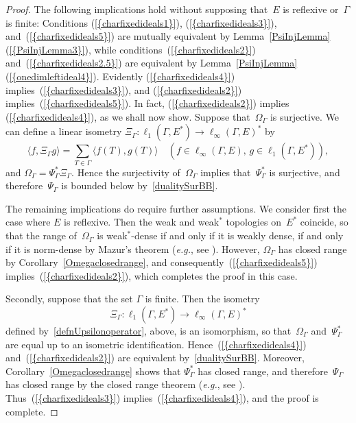 \documentclass[12pt]{amsart}
\theoremstyle{definition}
\numberwithin{equation}{section}
\begin{document}
\begin{proof}
  The following implications hold without supposing that~$E$ is
  reflexive or~$\Gamma$ is finite: Conditions
  {{\normalfont\textrm{(\ref{{charfixedideals1}})}}}, {{\normalfont\textrm{(\ref{{charfixedideals3}})}}},
  and~{{\normalfont\textrm{(\ref{{charfixedideals5}})}}} are mutually equivalent by
  Lemma~\ref{PsiInjLemma}{{\normalfont\textrm{(\ref{{PsiInjLemma3}})}}}, while
  conditions~{{\normalfont\textrm{(\ref{{charfixedideals2}})}}}
  and~{{\normalfont\textrm{(\ref{{charfixedideals2.5}})}}} are equivalent by
  Lemma~\ref{PsiInjLemma}{{\normalfont\textrm{(\ref{{onedimleftideal4}})}}}.  Evidently
  {{\normalfont\textrm{(\ref{{charfixedideals4}})}}} implies~{{\normalfont\textrm{(\ref{{charfixedideals3}})}}}, and
  {{\normalfont\textrm{(\ref{{charfixedideals2}})}}} im\-plies~{{\normalfont\textrm{(\ref{{charfixedideals5}})}}}. In
  fact, {{\normalfont\textrm{(\ref{{charfixedideals2}})}}} implies {{\normalfont\textrm{(\ref{{charfixedideals4}})}}},
  as we shall now show. Suppose that~$\Omega_\Gamma$ is surjective. We
  can define a linear isometry
  \mbox{$\Xi_\Gamma\colon\ell_1(\Gamma,E^*)\to\ell_\infty(\Gamma,E)^*$}
  by
  \begin{equation}\label{defnUpsilonoperator}
  \langle f,\Xi_\Gamma g\rangle = \sum_{T\in\Gamma} \bigl\langle f(T),
  g(T)\bigr\rangle\quad (f\in \ell_\infty(\Gamma,E),\,
  g\in\ell_1(\Gamma,E^*)), \end{equation} and $\Omega_\Gamma =
  \Psi_\Gamma^*\Xi_\Gamma$. Hence the surjectivity of~$\Omega_\Gamma$
  implies that~$\Psi_\Gamma^*$ is surjective, and
  therefore~$\Psi_\Gamma$ is bounded below by~\eqref{dualitySurBB}.

  The remaining implications do require further assumptions.  We
  consider first the case where $E$ is reflexive. Then the weak and
  weak$^*$ topologies on~$E^*$ coincide, so that the range
  of~$\Omega_\Gamma$ is weak$^*$-dense if and only if it is weakly
  dense, if and only if it is norm-dense by Mazur's theorem
  (\emph{e.g.}, see \cite[Theorem~2.5.16]{meg}). However,
  $\Omega_\Gamma$ has closed range by
  Cor\-ol\-lary~\ref{Omegaclosedrange}, and
  consequently~{{\normalfont\textrm{(\ref{{charfixedideals5}})}}}
  implies~{{\normalfont\textrm{(\ref{{charfixedideals2}})}}}, which completes the proof in
  this case.

  Secondly, suppose that the set $\Gamma$ is finite. Then the isometry
  $$\Xi_\Gamma\colon \ell_1(\Gamma,E^*)\to\ell_\infty(\Gamma,E)^*$$
  defined by~\eqref{defnUpsilonoperator}, above, is an isomorphism, so
  that~$\Omega_\Gamma$ and~$\Psi_\Gamma^*$ are equal up to an
  isometric identification. Hence~{{\normalfont\textrm{(\ref{{charfixedideals4}})}}}
  and~{{\normalfont\textrm{(\ref{{charfixedideals2}})}}} are equivalent
  by~\eqref{dualitySurBB}. Moreover,
  Cor\-ol\-lary~\ref{Omegaclosedrange} shows that $\Psi_\Gamma^*$ has
  closed range, and therefore~$\Psi_{\Gamma}$ has closed range by the
  closed range theorem (\emph{e.g.}, see
  \cite[Theorem~3.1.21]{meg}). Thus~{{\normalfont\textrm{(\ref{{charfixedideals3}})}}}
  implies~{{\normalfont\textrm{(\ref{{charfixedideals4}})}}}, and the proof is complete.
\end{proof}
\end{document}
